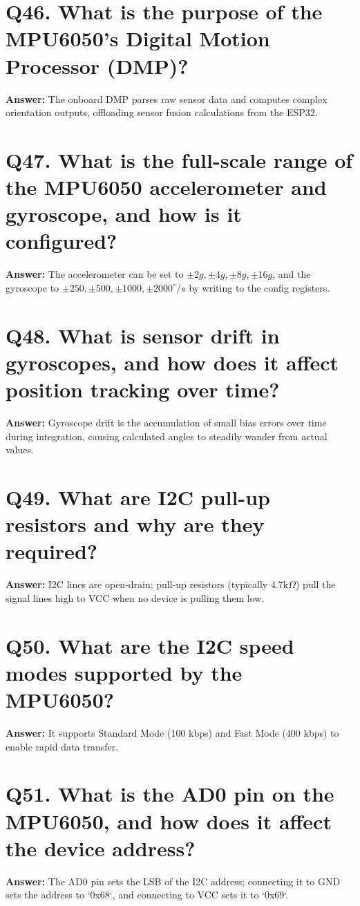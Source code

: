\documentclass[12pt,a4paper,oneside]{report}
\begin{document}
\section{Q46. What is the purpose of the MPU6050's Digital Motion Processor (DMP)?}
\textbf{Answer:} The onboard DMP parses raw sensor data and computes complex orientation outputs, offloading sensor fusion calculations from the ESP32.

\section{Q47. What is the full-scale range of the MPU6050 accelerometer and gyroscope, and how is it configured?}
\textbf{Answer:} The accelerometer can be set to $\pm2g, \pm4g, \pm8g, \pm16g$, and the gyroscope to $\pm250, \pm500, \pm1000, \pm2000^{\circ}/s$ by writing to the config registers.

\section{Q48. What is sensor drift in gyroscopes, and how does it affect position tracking over time?}
\textbf{Answer:} Gyroscope drift is the accumulation of small bias errors over time during integration, causing calculated angles to steadily wander from actual values.

\section{Q49. What are I2C pull-up resistors and why are they required?}
\textbf{Answer:} I2C lines are open-drain; pull-up resistors (typically 4.7k$\Omega$) pull the signal lines high to VCC when no device is pulling them low.

\section{Q50. What are the I2C speed modes supported by the MPU6050?}
\textbf{Answer:} It supports Standard Mode (100 kbps) and Fast Mode (400 kbps) to enable rapid data transfer.

\section{Q51. What is the AD0 pin on the MPU6050, and how does it affect the device address?}
\textbf{Answer:} The AD0 pin sets the LSB of the I2C address; connecting it to GND sets the address to `0x68`, and connecting to VCC sets it to `0x69`.
\end{document}
